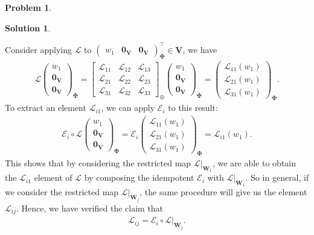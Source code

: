 \documentclass{book}
\theoremstyle{definition}
\newtheorem*{prob*}{Problem}
\newtheorem*{sln*}{Solution}
\newcommand{\V}{\mathbf{V}}
\newcommand{\W}{\mathbf{W}}
\newcommand{\lag}{\mathcal{L}}
\newcommand{\E}{\mathcal{E}}
\begin{document}
\begin{prob*}
\begin{sln*}
\begin{enumerate}
			Consider applying $\lag$ to $\begin{pmatrix}
			w_1 & \mathbf{0}_\V & \mathbf{0}_\V
			\end{pmatrix}^\top_\maltese \in \V$, we have
			\begin{align*}
			\lag\begin{pmatrix}
			w_1 \\ \mathbf{0}_\V \\ \mathbf{0}_\V
			\end{pmatrix}_\maltese = \begin{bmatrix}
			\lag_{11} & \lag_{12} & \lag_{13}\\
			\lag_{21} & \lag_{22} & \lag_{23}\\
			\lag_{31} & \lag_{32} & \lag_{33}
			\end{bmatrix}_\oplus
			\begin{pmatrix}
			w_1 \\ \mathbf{0}_\V \\ \mathbf{0}_\V
			\end{pmatrix}_\maltese
			=
			\begin{pmatrix}
			\lag_{11}(w_1)\\
			\lag_{21}(w_1)\\
			\lag_{31}(w_1)
			\end{pmatrix}_\maltese.
			\end{align*}
			To extract an element $\lag_{i1}$, we can apply $\E_i$ to this result:
			\begin{align*}
			\E_i \circ \lag \begin{pmatrix}
			w_1 \\ \mathbf{0}_\V \\ \mathbf{0}_\V
			\end{pmatrix}_\maltese = \E_i \begin{pmatrix}
			\lag_{11}(w_1)\\
			\lag_{21}(w_1)\\
			\lag_{31}(w_1)
			\end{pmatrix}_\maltese = \lag_{i1}(w_1).
			\end{align*}
			This shows that by considering the restricted map $\lag\bigg\vert_{\W_1}$, we are able to obtain the $\lag_{{i1}}$ element of $\lag$ by composing the idempotent $\E_i$ with $\lag\bigg\vert_{\W_1}$. So in general, if we consider the restricted map $\lag\bigg\vert_{\W_j}$, the same procedure will give us the element $\lag_{ij}$.  Hence, we have verified the claim that
			\begin{align*}
			\lag_{{ij}} = \E_i \circ \lag\bigg\vert_{\W_j}.
			\end{align*}
			

\end{enumerate}
\end{sln*}
\end{prob*}
\end{document}
